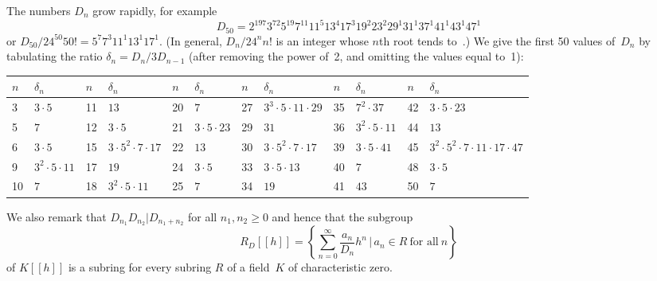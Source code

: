 \documentclass[pdftex]{sigma}
\numberwithin{equation}{section}
\def\tcdot{\!\cdot\!}
\begin{document}
The numbers $D_n$ grow rapidly, for example
\[
D_{50} = 2^{197} 3^{72} 5^{19} 7^{11} 11^5 13^4 17^3 19^2 23^2 29^1
 31^1 37^1 41^1 43^1 47^1
\]
or $D_{50}/24^{50}50!=5^7 7^3 11^1 13^1 17^1$. \big(In general, $D_n/24^nn!$ is an
integer whose $n$th root tends to~.\big)
We give the first 50 values of~$D_n$ by tabulating the ratio $\delta_n=D_n/3D_{n-1}$
(after removing the power of~2, and omitting the values equal to~1):

\begin{center}
\small
\begin{tabular}{|ll|ll|ll|ll|ll|ll|}
\hline
$n$ & $\delta_n$ & $n$ & $\delta_n$ & $n$ & $\delta_n$ & $n$ & $\delta_n$ &
$n$ & $\delta_n$ & $n$ & $\delta_n$
\\ \hline
3 & $3 \tcdot 5$ &
11 & $13$ &
20 & $7$ &
27 & $3^3 \tcdot 5 \tcdot 11 \tcdot 29\!$ &
35 & $7^2 \tcdot 37$ &
42 & $3 \tcdot 5 \tcdot 23$
\\ %
5 & $7$ &
12 & $3 \tcdot 5$ &
21 & $3 \tcdot 5 \tcdot 23\!$ &
29 & $31$ &
36 & $3^2 \tcdot 5 \tcdot 11$ &
44 & $13$
\\ %
6 & $3 \tcdot 5$ &
15 & $3 \tcdot 5^2 \tcdot 7 \tcdot 17\!$ &
22 & $13$ &
30 & $3 \tcdot 5^2 \tcdot 7 \tcdot 17$ &
39 & $3 \tcdot 5 \tcdot 41$ &
45 & $3^2 \tcdot 5^2 \tcdot 7 \tcdot 11 \tcdot 17 \tcdot 47\!$
\\ %
9 & $3^2 \tcdot 5 \tcdot 11\!$ &
17 & $19$ &
24 & $3 \tcdot 5$ &
33 & $3 \tcdot 5 \tcdot 13$ &
40 & $7$ &
48 & $3 \tcdot 5$
\\ %
10 & $7$ &
18 & $3^2 \tcdot 5 \tcdot 11$ &
25 & $7$ &
34 & $19$ &
41 & $43$ &
50 & $7$
\\ \hline
\end{tabular}

\end{center}

\noindent
We also remark that $D_{n_1}D_{n_2}|D_{n_1+n_2}$ for all $n_1,n_2\ge0$ and hence
that the subgroup
\[%
R_D[[h]] = \left\{ \sum_{n=0}^\infty \frac{a_n}{D_n} h^n  \,\big|\,
a_n \in R \  \text{for all} \   n \right\}
\]
of $K[[h]]$ is a subring for every subring $R$ of a field~$K$ of characteristic zero.
\end{document}
